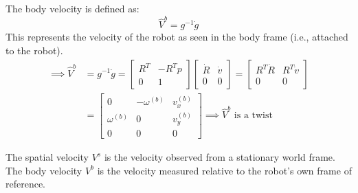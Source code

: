 The body velocity is defined as:
\[
    \hat{V}^{b} = g^{-1} \dot{g}
\]
This represents the velocity of the robot as seen in the body frame (i.e., attached to the robot).
\begin{align*}
    \implies
    \hat{V}^{b}
     & =
    g^{-1} \dot{g}
    =
    \begin{bmatrix}
        R^T & -R^T p \\
        0   & 1
    \end{bmatrix}
    \begin{bmatrix}
        \dot R & \dot v \\
        0      & 0
    \end{bmatrix}
    =
    \begin{bmatrix}
        R^T \dot R & R^T \dot v \\
        0          & 0
    \end{bmatrix}
    \\ & =
    \begin{bmatrix}
        0            & -\omega^{(b)} & v_x^{(b)} \\
        \omega^{(b)} & 0             & v_y^{(b)} \\
        0            & 0             & 0
    \end{bmatrix}
    \implies
    \hat{V}^{b} \text{ is a twist}
\end{align*}

The spatial velocity \( V^s \) is the velocity observed from a stationary world frame.
The body velocity \( V^b \) is the velocity measured relative to the robot's own frame of reference.
